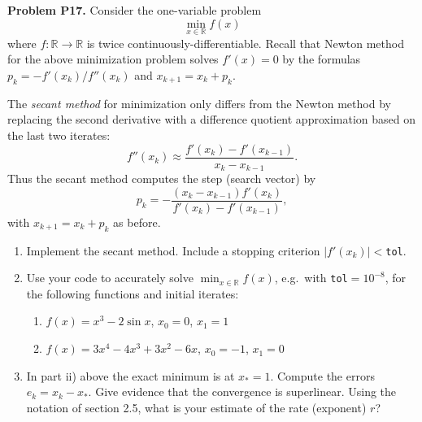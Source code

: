 \documentclass[12pt]{amsart}
\newcommand{\RR}{\mathbb{R}}
\newcommand{\prob}[1]{\bigskip\noindent\textbf{#1}\quad }
\begin{document}
\medskip
\prob{Problem P17.}  Consider the one-variable problem
    $$\min_{x\in\RR} f(x)$$
where $f:\RR\to\RR$ is twice continuously-differentiable.  Recall that Newton method for the above minimization problem solves $f'(x)=0$ by the formulas $p_k = - f'(x_k)/f''(x_k)$ and $x_{k+1} = x_k + p_k$.

The \emph{secant method} for minimization only differs from the Newton method by replacing the second derivative with a difference quotient approximation based on the last two iterates:
    $$f''(x_k) \approx \frac{f'(x_k) - f'(x_{k-1})}{x_k - x_{k-1}}.$$
Thus the secant method computes the step (search vector) by
    $$p_k = - \frac{(x_k - x_{k-1}) f'(x_k)}{f'(x_k) - f'(x_{k-1})},$$
with $x_{k+1} = x_k + p_k$ as before.

\renewcommand{\labelenumi}{\textbf{\alph{enumi})}}
\renewcommand{\labelenumii}{\roman{enumii})}
\begin{enumerate}
\item Implement the secant method.  Include a stopping criterion $|f'(x_k)| <$\texttt{tol}.
\item Use your code to accurately solve $\min_{x\in\RR} f(x)$, e.g.~with \texttt{tol}$=10^{-8}$, for the following functions and initial iterates:
    \begin{enumerate}
    \item $f(x)=x^3-2\sin x$, \quad $x_0=0$, \quad $x_1=1$
    \item $f(x)=3x^4-4x^3+3x^2-6x$, \quad $x_0=-1$, \quad $x_1=0$
    \end{enumerate}
\item In part ii) above the exact minimum is at $x_*=1$.  Compute the errors $e_k=x_k-x_*$.  Give evidence that the convergence is superlinear.  Using the notation of section 2.5, what is your estimate of the rate (exponent) $r$?
\end{enumerate}
\end{document}
